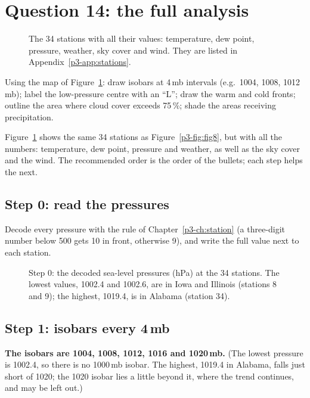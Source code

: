 \section{Question 14: the full analysis}\label{p3-sec:fig10}

\begin{figure}[H]
\centering
\mapbase{0.0196cm}{}
\caption{The 34 stations with all their values: temperature, dew point, pressure, weather, sky cover and wind. They are listed in Appendix~\ref{p3-app:stations}.}\label{p3-fig:fig10}
\end{figure}

\begin{questionbox}
Using the map of Figure~\ref{p3-fig:fig10}: draw isobars at 4\,mb intervals (e.g.\ 1004, 1008, 1012\,mb); label the low-pressure centre with an ``L''; draw the warm and cold fronts; outline the area where cloud cover exceeds 75\,\%; shade the areas receiving precipitation.
\end{questionbox}

Figure~\ref{p3-fig:fig10} shows the same 34 stations as Figure~\ref{p3-fig:fig8}, but with all the numbers: temperature, dew point, pressure and weather, as well as the sky cover and the wind. The recommended order is the order of the bullets; each step helps the next.

\subsection{Step 0: read the pressures}

Decode every pressure with the rule of Chapter~\ref{p3-ch:station} (a three-digit number below 500 gets 10 in front, otherwise 9), and write the full value next to each station.

\begin{figure}[ht]
\centering
\mapbase{0.0196cm}{}
\caption{Step 0: the decoded sea-level pressures (hPa) at the 34 stations. The lowest values, 1002.4 and 1002.6, are in Iowa and Illinois (stations 8 and 9); the highest, 1019.4, is in Alabama (station 34).}\label{p3-fig:pressures}
\end{figure}

\subsection{Step 1: isobars every 4\,mb}

\textbf{The isobars are 1004, 1008, 1012, 1016 and 1020\,mb.} (The lowest pressure is 1002.4, so there is no 1000\,mb isobar. The highest, 1019.4 in Alabama, falls just short of 1020; the 1020 isobar lies a little beyond it, where the trend continues, and may be left out.)

